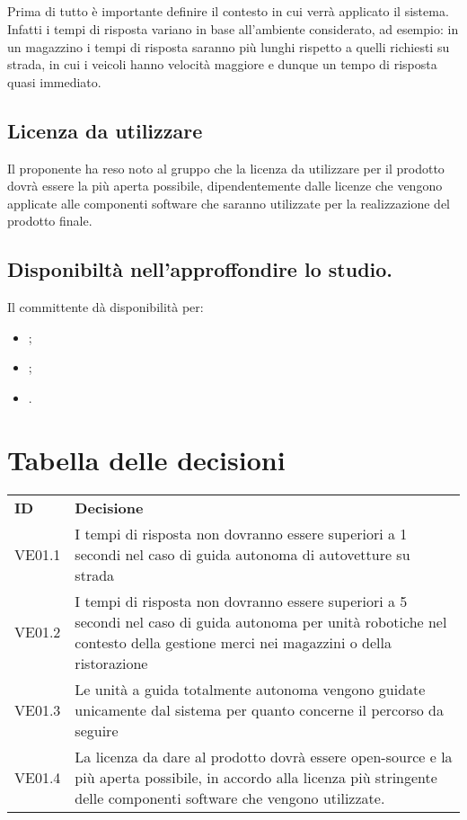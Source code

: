 \documentclass[]{article}
\begin{document}
		\subsection{}
		Prima di tutto è importante definire il contesto in cui verrà applicato il sistema.\\
		Infatti i tempi di risposta variano in base all'ambiente considerato, ad esempio: in un magazzino i tempi di risposta saranno più lunghi
		rispetto a quelli richiesti su strada, in cui i veicoli hanno velocità maggiore e dunque un tempo di risposta quasi immediato.

		\subsection{Licenza da utilizzare}
		Il proponente ha reso noto al gruppo che la licenza  da utilizzare per il prodotto dovrà essere la più aperta possibile, dipendentemente dalle licenze che vengono applicate alle componenti software che saranno utilizzate per la realizzazione del prodotto finale.

		\subsection{Disponibiltà nell'approffondire lo studio.}
		Il committente dà disponibilità per:
		\begin{itemize}
			\item {};
			\item {};
			\item {}.
		\end{itemize}

		\section{Tabella delle decisioni}

		\begin{table} [h!]
			\begin{center}
				\begin{tabular} { m{2cm} m{14cm} }
					\rowcolor{lightgray}
					\textbf{ID} & \textbf{Decisione}\\
					VE01.1 & I tempi di risposta non dovranno essere superiori a 1 secondi nel caso di guida autonoma di autovetture su strada \\
					VE01.2 & I tempi di risposta non dovranno essere superiori a 5 secondi nel caso di guida autonoma per unità robotiche nel contesto della gestione merci nei magazzini o della ristorazione \\
					VE01.3 & Le unità a guida totalmente autonoma vengono guidate unicamente dal sistema per quanto concerne il percorso da seguire \\
					VE01.4 & La licenza da dare al prodotto dovrà essere open-source e la più aperta possibile, in accordo alla licenza più stringente delle componenti software che vengono utilizzate.
				\end{tabular}
			\end{center}
		\end{table}
\end{document}
